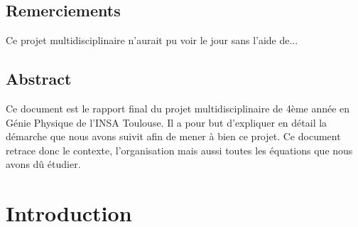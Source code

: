 \documentclass{report}
\begin{document}

\begin{center}
    \thispagestyle{empty} %
    \vspace*{\fill}
    \section*{Remerciements}
    
    Ce projet multidisciplinaire n'aurait pu voir le jour sans l'aide de...
    
    \vspace*{\fill}
\end{center}
\clearpage

\begin{center}
    \thispagestyle{empty} %
    \vspace*{\fill}
    \section*{Abstract}
    
    Ce document est le rapport final du projet multidisciplinaire de 4ème année en Génie Physique de l'INSA Toulouse. Il a pour but d'expliquer en détail la démarche que nous avons suivit 
    afin de mener à bien ce projet. Ce document retrace donc le contexte, l'organisation mais aussi toutes les équations que nous avons dû étudier. 
    
    \vspace*{\fill}
\end{center}
\clearpage

\tableofcontents

\chapter{Introduction}
\end{document}
